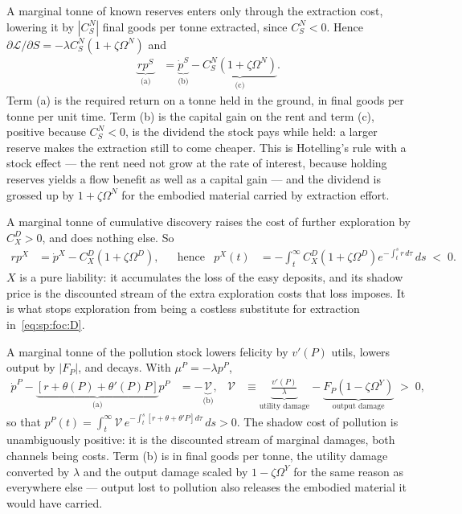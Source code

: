  A marginal tonne of known reserves enters only through the extraction cost, lowering it by $\left|C^N_S\right|$ final goods per tonne extracted, since $C^N_S<0$. Hence $\partial\mathcal L/\partial S=-\lambda C^N_S\left(1+\zeta\Omega^N\right)$ and
\begin{align}
\underbrace{rp^S}_{\text{(a)}} &= \underbrace{\dot p^S}_{\text{(b)}} - \underbrace{C^N_S\left(1+\zeta\Omega^N\right)}_{\text{(c)}} .
\label{eq:sp:costate:S}
\end{align}
Term (a) is the required return on a tonne held in the ground, in final goods per tonne per unit time. Term (b) is the capital gain on the rent and term (c), positive because $C^N_S<0$, is the dividend the stock pays while held: a larger reserve makes the extraction still to come cheaper. This is Hotelling's rule with a stock effect --- the rent need not grow at the rate of interest, because holding reserves yields a flow benefit as well as a capital gain --- and the dividend is grossed up by $1+\zeta\Omega^N$ for the embodied material carried by extraction effort.

 A marginal tonne of cumulative discovery raises the cost of further exploration by $C^D_X>0$, and does nothing else. So
\begin{align}
rp^X &= \dot p^X - C^D_X\left(1+\zeta\Omega^D\right),
&&\text{hence}
&
p^X(t) &= -\int_t^\infty C^D_X\left(1+\zeta\Omega^D\right)e^{-\int_t^s r\,d\tau}\,ds\;<\;0 .
\label{eq:sp:costate:X}
\end{align}
$X$ is a pure liability: it accumulates the loss of the easy deposits, and its shadow price is the discounted stream of the extra exploration costs that loss imposes. It is what stops exploration from being a costless substitute for extraction in~\eqref{eq:sp:foc:D}.

 A marginal tonne of the pollution stock lowers felicity by $v'\left(P\right)$ utils, lowers output by $\left|F_P\right|$, and decays. With $\mu^P=-\lambda p^P$,
\begin{align}
\dot p^P-\underbrace{\left[r+\theta\left(P\right)+\theta'\left(P\right)P\right]}_{\text{(a)}}p^P &= -\underbrace{\mathcal V}_{\text{(b)}},
&
\mathcal V &\equiv \underbrace{\frac{v'\left(P\right)}{\lambda}}_{\text{utility damage}}-\underbrace{F_P\left(1-\zeta\Omega^Y\right)}_{\text{output damage}}\;>\;0,
\label{eq:sp:costate:P}
\end{align}
so that $p^P(t)=\int_t^\infty\mathcal V\,e^{-\int_t^s\left[r+\theta+\theta'P\right]d\tau}\,ds>0$. The shadow cost of pollution is unambiguously positive: it is the discounted stream of marginal damages, both channels being costs. Term (b) is in final goods per tonne, the utility damage converted by $\lambda$ and the output damage scaled by $1-\zeta\Omega^Y$ for the same reason as everywhere else --- output lost to pollution also releases the embodied material it would have carried.

